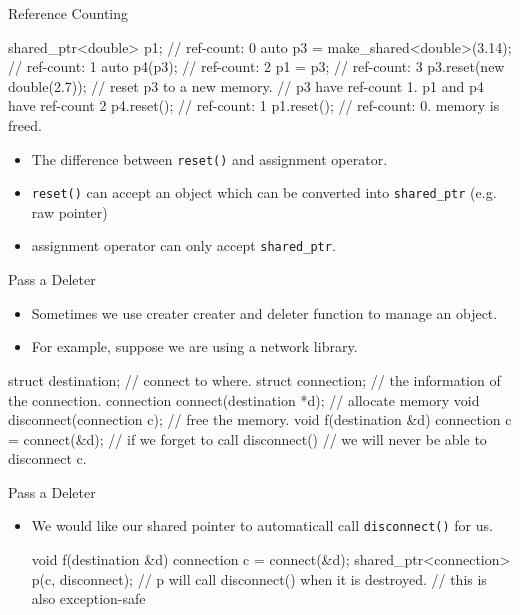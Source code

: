 \begin{frame}[fragile]{Reference Counting}
  \begin{cpp}
shared_ptr<double> p1;               // ref-count: 0 
auto p3 = make_shared<double>(3.14); // ref-count: 1
auto p4(p3); // ref-count: 2
p1 = p3;     // ref-count: 3
p3.reset(new double(2.7)); // reset p3 to a new memory.
// p3 have ref-count 1. p1 and p4 have ref-count 2
p4.reset(); // ref-count: 1
p1.reset(); // ref-count: 0. memory is freed.
  \end{cpp} 
\begin{itemize}\pause
  \item The difference between \texttt{reset()} and assignment operator.
  \item \texttt{reset()} can accept an object which can be converted into \texttt{shared\_ptr} (e.g. raw pointer)
  \item assignment operator can only accept \texttt{shared\_ptr}.
\end{itemize}
\end{frame}
\begin{frame}[fragile]{Pass a Deleter}
  \begin{itemize}
    \item Sometimes we use creater creater and deleter function to manage an object.\pause
    \item For example, suppose we are using a network library.

  \end{itemize}
  \begin{cpp}
struct destination; // connect to where.
struct connection;  // the information of the connection.
connection connect(destination *d); // allocate memory
void disconnect(connection c); // free the memory.
void f(destination &d) {
  connection c = connect(&d);
  // if we forget to call disconnect()
  // we will never be able to disconnect c.
}
        \end{cpp}
\end{frame}
\begin{frame}[fragile]{Pass a Deleter}
  \begin{itemize}
    \item We would like our shared pointer to automaticall call \texttt{disconnect()} for us.
    \begin{cpp}
void f(destination &d) {
  connection c = connect(&d);
  shared_ptr<connection> p(c, disconnect);
  // p will call disconnect() when it is destroyed.
  // this is also exception-safe
}
    \end{cpp}
  \end{itemize}
\end{frame}
